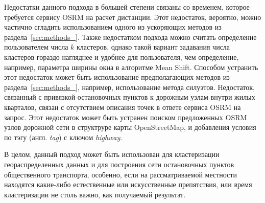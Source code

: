 Недостатки данного подхода в большей степени связаны со временем, которое требуется сервису OSRM на расчет дистанции. Этот недостаток, вероятно, можно частично сгладить использованием одного из ускоряющих методов из раздела~\ref{sec:methods_}. Также недостатком подхода можно считать определение пользователем числа \( k \) кластеров, однако такой вариант задавания числа кластеров гораздо нагляднее и удобнее для пользователя, чем определение, например, параметра ширины окна в алгоритме Mean Shift. Способом устранить этот недостаток может быть использование предполагающих методов из раздела~\ref{sec:methods_}, например, использование метода силуэтов. Недостаток, связанный с привязкой остановочных пунктов к дорожным узлам внутри жилых кварталов, связан с отсутствием описания точек в ответе сервиса OSRM на запрос. Этот недостаток может быть устранен поиском предложенных OSRM узлов дорожной сети в структруре карты OpenStreetMap, и добавления условия по тэгу (англ. \emph{tag}) с ключом \emph{highway}.

В целом, данный подход может быть использован для кластеризации геораспределенных данных и для построения сети остановочных пунктов общественного транспорта, особенно, если на рассматриваемой местности находятся какие-либо естественные или искусственные препятствия, или время кластеризации не столь важно, как получаемый результат.
